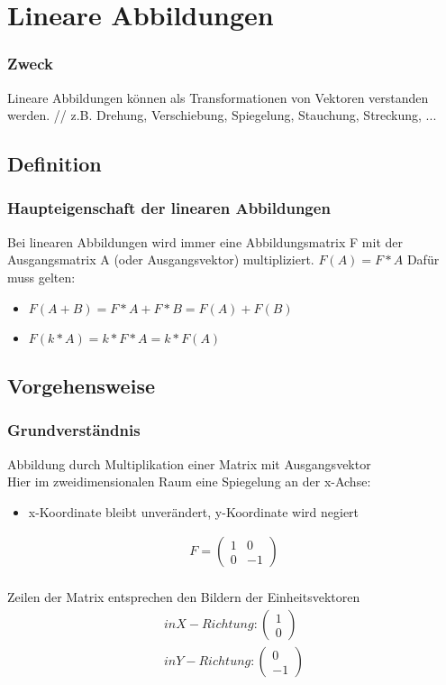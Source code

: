 \section{Lineare Abbildungen}
\begin{frame}
    \frametitle{Zweck}
    Lineare Abbildungen können als Transformationen von Vektoren verstanden werden. //
    z.B. Drehung, Verschiebung, Spiegelung, Stauchung, Streckung, ...
\end{frame}

\subsection{Definition}

\begin{frame}
	\frametitle{Haupteigenschaft der linearen Abbildungen}
	Bei linearen Abbildungen wird immer eine Abbildungsmatrix F mit der Ausgangsmatrix A (oder Ausgangsvektor) multipliziert. $F(A)=F*A$
	\newline
	Dafür muss gelten:
	\begin{itemize}
		\item $F(A+B)= F*A+F*B = F(A)+F(B)$
		\item $F(k*A)= k*F*A = k*F(A)$
	\end{itemize}
\end{frame}

\subsection{Vorgehensweise}

\begin{frame}
	\frametitle{Grundverständnis}
	Abbildung durch Multiplikation einer Matrix mit Ausgangsvektor \\
	Hier im zweidimensionalen Raum eine Spiegelung an der x-Achse:
	\begin{itemize}
		\item x-Koordinate bleibt unverändert, y-Koordinate wird negiert
	  \end{itemize}
	  \begin{gather*}
		F = \begin{pmatrix}
			1 & 0 \\
			0 & -1
			\end{pmatrix} \\ \end{gather*}
		
		Zeilen der Matrix entsprechen den Bildern der Einheitsvektoren
		\begin{gather*} in X-Richtung:  \begin{pmatrix}
			1 \\
			0 
			\end{pmatrix} \\
		in Y-Richtung: \begin{pmatrix}
			0 \\
			-1
			\end{pmatrix} \\ \end{gather*}
\end{frame}

